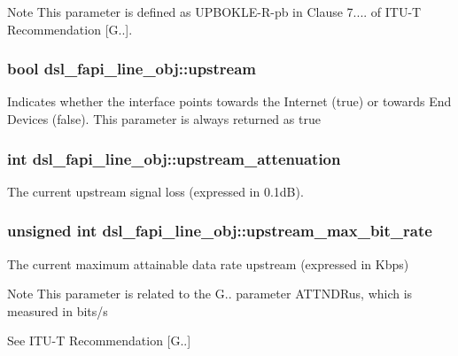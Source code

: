 \begin{DoxyNote}{Note}
This parameter is defined as U\-P\-B\-O\-K\-L\-E-\/\-R-\/pb in Clause 7.... of I\-T\-U-\/\-T Recommendation \mbox{[}G..\mbox{]}. 
\end{DoxyNote}
\hypertarget{structdsl__fapi__line__obj_abbf14e370be31a02b4d46c2e0bafba17}{
\subsubsection[{upstream}]{\setlength{\rightskip}{0pt plus 5cm}bool dsl\-\_\-fapi\-\_\-line\-\_\-obj\-::upstream}}\label{structdsl__fapi__line__obj_abbf14e370be31a02b4d46c2e0bafba17}
Indicates whether the interface points towards the Internet (true) or towards End Devices (false). This parameter is always returned as true \hypertarget{structdsl__fapi__line__obj_af0ca7939507cc4cd14d361b2fabc6700}{
\subsubsection[{upstream\-\_\-attenuation}]{\setlength{\rightskip}{0pt plus 5cm}int dsl\-\_\-fapi\-\_\-line\-\_\-obj\-::upstream\-\_\-attenuation}}\label{structdsl__fapi__line__obj_af0ca7939507cc4cd14d361b2fabc6700}
The current upstream signal loss (expressed in 0.\-1d\-B). \hypertarget{structdsl__fapi__line__obj_a77393004674703f57ced05902108019d}{
\subsubsection[{upstream\-\_\-max\-\_\-bit\-\_\-rate}]{\setlength{\rightskip}{0pt plus 5cm}unsigned int dsl\-\_\-fapi\-\_\-line\-\_\-obj\-::upstream\-\_\-max\-\_\-bit\-\_\-rate}}\label{structdsl__fapi__line__obj_a77393004674703f57ced05902108019d}
The current maximum attainable data rate upstream (expressed in Kbps) \begin{DoxyNote}{Note}
This parameter is related to the G.. parameter A\-T\-T\-N\-D\-Rus, which is measured in bits/s 

See I\-T\-U-\/\-T Recommendation \mbox{[}G..\mbox{]} 
\end{DoxyNote}
